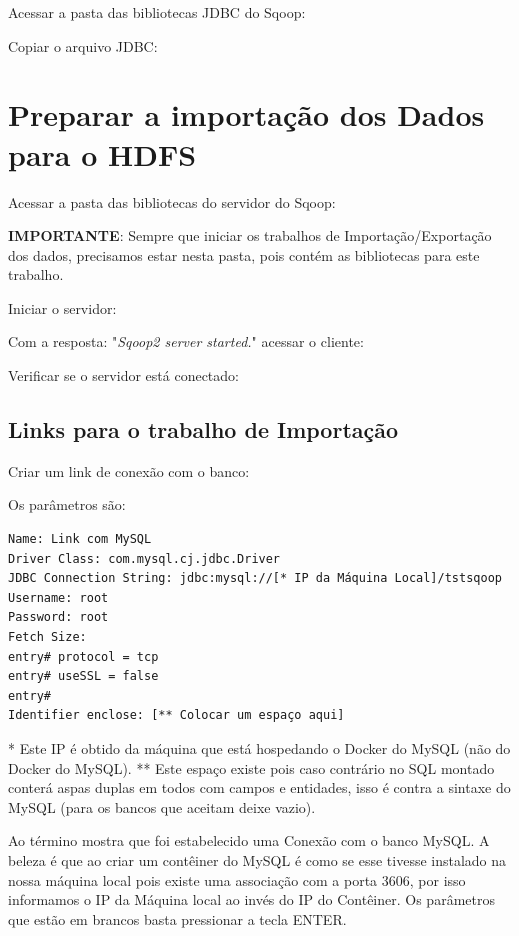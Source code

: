 \documentclass[a4paper,11pt]{article}
\begin{document}
Acessar a pasta das bibliotecas JDBC do Sqoop: \\

Copiar o arquivo JDBC: \\

\section{Preparar a importação dos Dados para o HDFS}
Acessar a pasta das bibliotecas do servidor do Sqoop: \\

\textbf{IMPORTANTE}: Sempre que iniciar os trabalhos de Importação/Exportação dos dados, precisamos estar nesta pasta, pois contém as bibliotecas para este trabalho.

Iniciar o servidor: \\

Com a resposta: "\textit{Sqoop2 server started.}" acessar o cliente: \\

Verificar se o servidor está conectado: \\

\subsection{Links para o trabalho de Importação}
Criar um link de conexão com o banco: \\

Os parâmetros são:
\begin{lstlisting}[]
Name: Link com MySQL
Driver Class: com.mysql.cj.jdbc.Driver
JDBC Connection String: jdbc:mysql://[* IP da Máquina Local]/tstsqoop
Username: root
Password: root
Fetch Size:
entry# protocol = tcp
entry# useSSL = false
entry#
Identifier enclose: [** Colocar um espaço aqui]
\end{lstlisting}

* Este IP é obtido da máquina que está hospedando o Docker do MySQL (não do Docker do MySQL).
** Este espaço existe pois caso contrário no SQL montado conterá aspas duplas em todos com campos e entidades, isso é contra a sintaxe do MySQL (para os bancos que aceitam deixe vazio).

Ao término mostra que foi estabelecido uma Conexão com o banco MySQL. A beleza é que ao criar um contêiner do MySQL é como se esse tivesse instalado na nossa máquina local pois existe uma associação com a porta 3606, por isso informamos o IP da Máquina local ao invés do IP do Contêiner. Os parâmetros que estão em brancos basta pressionar a tecla ENTER.
\end{document}
